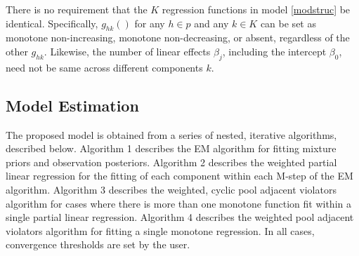 \documentclass[10pt]{olplainarticle}\usepackage[]{graphicx}\usepackage[]{color}
\begin{document}
There is no requirement that the $K$ regression functions in model \ref{modstruc} be identical. Specifically, $g_{hk}()$ for any $h \in p$ and any $k \in K$ can be set as monotone non-increasing, monotone non-decreasing, or absent, regardless of the other $g_{hk}$. Likewise, the number of linear effects $\beta_{j}$, including the intercept $\beta_0$, need not be same across different components $k$.


\subsection{Model Estimation}

The proposed model is obtained from a series of nested, iterative algorithms, described below. Algorithm 1 describes the EM algorithm for fitting mixture priors and observation posteriors. Algorithm 2 describes the weighted partial linear regression for the fitting of each component within each M-step of the EM algorithm. Algorithm 3 describes the weighted, cyclic pool adjacent violators algorithm for cases where there is more than one monotone function fit within a single partial linear regression. Algorithm 4 describes the weighted pool adjacent violators algorithm for fitting a single monotone regression. In all cases, convergence thresholds are set by the user.
\end{document}
